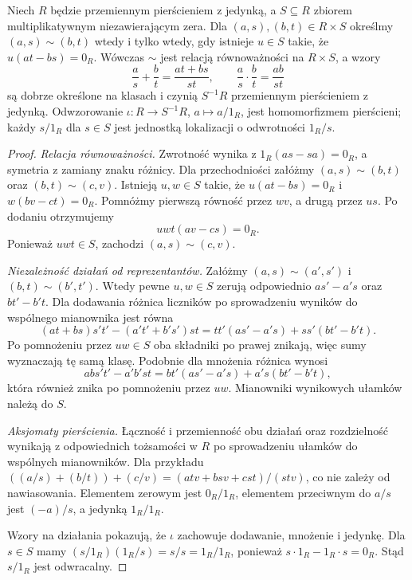 \begin{twierdzenie}
\label{aa:tw:localization-well-defined}
Niech $R$ będzie przemiennym pierścieniem z jedynką,
a $S\subseteq R$ zbiorem multiplikatywnym niezawierającym zera.
Dla $(a,s),(b,t)\in R\times S$ określmy
$(a,s)\sim(b,t)$ wtedy i tylko wtedy, gdy istnieje $u\in S$
takie, że $u(at-bs)=0_R$. Wówczas $\sim$ jest relacją
równoważności na $R\times S$, a wzory
\[
\frac as+\frac bt=\frac{at+bs}{st},\qquad
\frac as\cdot\frac bt=\frac{ab}{st}
\]
są dobrze określone na klasach i czynią $S^{-1}R$
przemiennym pierścieniem z jedynką. Odwzorowanie
$\iota:R\to S^{-1}R$, $a\mapsto a/1_R$, jest
homomorfizmem pierścieni; każdy $s/1_R$ dla $s\in S$
jest jednostką lokalizacji o odwrotności $1_R/s$.
\end{twierdzenie}
\begin{proof}
\emph{Relacja równoważności.} Zwrotność wynika z
$1_R(as-sa)=0_R$, a symetria z zamiany znaku
różnicy. Dla przechodniości załóżmy
$(a,s)\sim(b,t)$ oraz $(b,t)\sim(c,v)$.
Istnieją $u,w\in S$ takie, że
$u(at-bs)=0_R$ i $w(bv-ct)=0_R$.
Pomnóżmy pierwszą równość przez $wv$,
a drugą przez $us$. Po dodaniu otrzymujemy
\[
 uwt(av-cs)=0_R.
\]
Ponieważ $uwt\in S$, zachodzi $(a,s)\sim(c,v)$.

\emph{Niezależność działań od reprezentantów.}
Załóżmy $(a,s)\sim(a',s')$ i $(b,t)\sim(b',t')$.
Wtedy pewne $u,w\in S$ zerują odpowiednio
$as'-a's$ oraz $bt'-b't$. Dla dodawania różnica
liczników po sprowadzeniu wyników do wspólnego mianownika
jest równa
\[
 (at+bs)s't'-(a't'+b's')st
 =tt'(as'-a's)+ss'(bt'-b't).
\]
Po pomnożeniu przez $uw\in S$ oba składniki
po prawej znikają, więc sumy wyznaczają tę samą klasę.
Podobnie dla mnożenia różnica wynosi
\[
 ab s't'-a'b' st
 =bt'(as'-a's)+a's(bt'-b't),
\]
która również znika po pomnożeniu przez $uw$.
Mianowniki wynikowych ułamków należą do $S$.

\emph{Aksjomaty pierścienia.} Łączność i przemienność
obu działań oraz rozdzielność wynikają z odpowiednich
tożsamości w $R$ po sprowadzeniu ułamków do wspólnych
mianowników. Dla przykładu
$((a/s)+(b/t))+(c/v)=(atv+bsv+cst)/(stv)$,
co nie zależy od nawiasowania. Elementem zerowym
jest $0_R/1_R$, elementem przeciwnym do $a/s$
jest $(-a)/s$, a jedynką $1_R/1_R$.

Wzory na działania pokazują, że $\iota$ zachowuje
dodawanie, mnożenie i jedynkę. Dla $s\in S$ mamy
$(s/1_R)(1_R/s)=s/s=1_R/1_R$,
ponieważ $s\cdot1_R-1_R\cdot s=0_R$.
Stąd $s/1_R$ jest odwracalny.
\end{proof}

